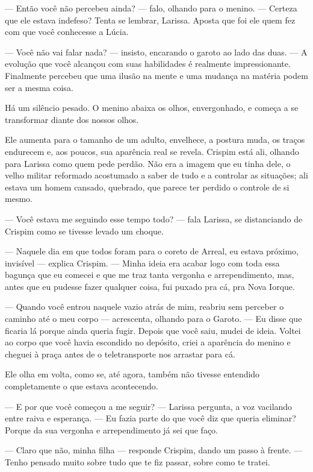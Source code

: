 — Então você não percebeu ainda? — falo, olhando para o menino. — Certeza que ele estava indefeso? Tenta se lembrar, Larissa. Aposta que foi ele quem fez com que você conhecesse a Lúcia.

— Você não vai falar nada? — insisto, encarando o garoto ao lado das duas. — A evolução que você alcançou com suas habilidades é realmente impressionante. Finalmente percebeu que uma ilusão na mente e uma mudança na matéria podem ser a mesma coisa.

Há um silêncio pesado.  
O menino abaixa os olhos, envergonhado, e começa a se transformar diante dos nossos olhos.

\bigskip

Ele aumenta para o tamanho de um adulto, envelhece, a postura muda, os traços endurecem e, aos poucos, sua aparência real se revela. Crispim está ali, olhando para Larissa como quem pede perdão. Não era a imagem que eu tinha dele, o velho militar reformado acostumado a saber de tudo e a controlar as situações; ali estava um homem cansado, quebrado, que parece ter perdido o controle de si mesmo.

— Você estava me seguindo esse tempo todo? — fala Larissa, se distanciando de Crispim como se tivesse levado um choque.

— Naquele dia em que todos foram para o coreto de Arreal, eu estava próximo, invisível — explica Crispim. — Minha ideia era acabar logo com toda essa bagunça que eu comecei e que me traz tanta vergonha e arrependimento, mas, antes que eu pudesse fazer qualquer coisa, fui puxado pra cá, pra Nova Iorque.

— Quando você entrou naquele vazio atrás de mim, reabriu sem perceber o caminho até o meu corpo — acrescenta, olhando para o Garoto. — Eu disse que ficaria lá porque ainda queria fugir. Depois que você saiu, mudei de ideia. Voltei ao corpo que você havia escondido no depósito, criei a aparência do menino e cheguei à praça antes de o teletransporte nos arrastar para cá.

Ele olha em volta, como se, até agora, também não tivesse entendido completamente o que estava acontecendo.

— E por que você começou a me seguir? — Larissa pergunta, a voz vacilando entre raiva e esperança. — Eu fazia parte do que você diz que queria eliminar? Porque da sua vergonha e arrependimento já sei que faço.

— Claro que não, minha filha — responde Crispim, dando um passo à frente. — Tenho pensado muito sobre tudo que te fiz passar, sobre como te tratei.


